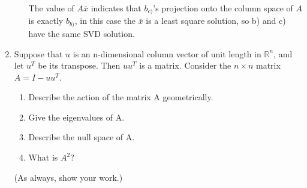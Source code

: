 \documentclass[conference,onecolumn]{IEEEtran}
\begin{document}
\begin{enumerate}[label=\arabic{enumi}.]
\begin{enumerate}
                    The value of $A\bar{x}$ indicates that $b_{c)}$'s projection onto the column space of $A$ is exactly $b_{b)}$, in this case the $\bar{x}$ is a least square solution, so b) and c) have the same SVD solution.
          \end{enumerate}

          \clearpage
    \item Suppose that $u$ is an n-dimensional column vector of unit length in $\mathbb{R}^n$, and let $u^T$ be its transpose.
          Then $uu^T$ is a matrix.
          Consider the $n \times n$ matrix $A = I - uu^T$.
          \begin{enumerate}
              \item Describe the action of the matrix A geometrically.
              \item Give the eigenvalues of A.
              \item Describe the null space of A.
              \item What is $A^2$?
          \end{enumerate}
          (As always, show your work.)


\end{enumerate}
\end{document}

